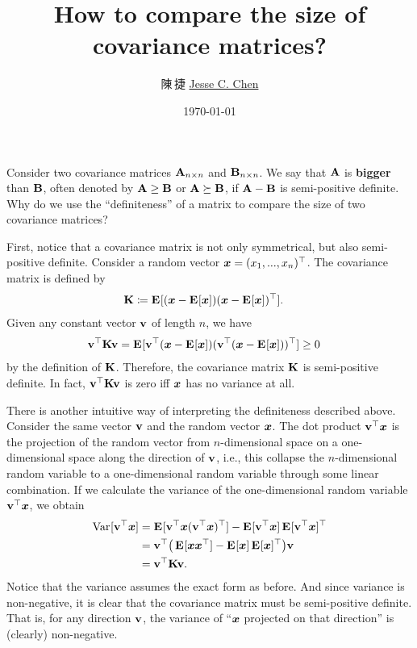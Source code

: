 \documentclass[a4paper]{article}
\title{How to compare the size of covariance matrices?}
\author{陳\,捷 \href{https://jessekelighine.com}{Jesse C. Chen}}
\date{\today}
\begin{document}
\maketitle

\begin{multicols*}{2}

\noindent
Consider two covariance matrices $\AA_{n\times n}$ and $\BB_{n\times n}$.
We say that $\AA$ is \textbf{bigger} than $\BB$,
often denoted by $\AA\geq \BB$ or $\AA\succeq \BB$, if $\AA-\BB$ is semi-positive definite.
Why do we use the ``definiteness'' of a matrix to compare the size of two covariance matrices?

First, notice that a covariance matrix is not only symmetrical, but also
semi-positive definite.  Consider a random vector $\xx=(x_1,...,x_n)\T$.
The covariance matrix is defined by
\begin{align*}
	\KK &\coloneqq \E{(\xx-\E{\xx})(\xx-\E{\xx})\T}.
\end{align*}
Given any constant vector $\vv$ of length $n$, we have
\begin{align*}
	\vv\T \KK \vv &= \E{\vv\T(\xx-\E{\xx})(\vv\T(\xx-\E{\xx}))\T} \geq 0
\end{align*}
by the definition of $\KK$.
Therefore, the covariance matrix $\KK$ is semi-positive definite.
In fact, $\vv\T\KK\vv$ is zero iff $\xx$ has no variance at all.

There is another intuitive way of interpreting the definiteness described above.
Consider the same vector $\vv$ and the random vector $\xx$.
The dot product $\vv\T \xx$ is the projection of the random vector from $n$-dimensional
space on a one-dimensional space along the direction of $\vv$, i.e.,
this collapse the $n$-dimensional random variable to a one-dimensional random variable through some linear combination.
If we calculate the variance of the one-dimensional random variable $\vv\T \xx$, we obtain
\begin{align*}
	\var{\vv\T \xx}
	&= \E{\vv\T \xx(\vv\T \xx)\T } - \E{\vv\T \xx}\E{\vv\T \xx}\T  \\
	&= \vv\T \big(\E{\xx\xx\T } - \E{\xx}\E{\xx}\T \big)\vv \\
	&= \vv\T \KK\vv.
\end{align*}
Notice that the variance assumes the exact form as before.
And since variance is non-negative, it is clear that the covariance matrix must be semi-positive definite.
That is, for any direction $\vv$,
the variance of ``$\xx$ projected on that direction'' is (clearly) non-negative.


\end{multicols*}
\end{document}
